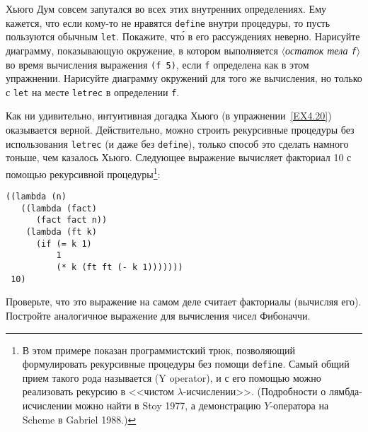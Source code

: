 \begin{exercise}{4.20}
\begin{plainenum}
\item
Хьюго Дум совсем запутался во всех этих
внутренних определениях.  Ему кажется, что если кому-то не нравятся
{\tt define} внутри процедуры, то пусть пользуются обычным
{\tt let}.  Покажите, чт\'{о} в его рассуждениях неверно. Нарисуйте
диаграмму, показывающую окружение, в котором выполняется
\textit{$\langle$остаток тела {\tt f}$\rangle$} во время вычисления
выражения {\tt (f 5)}, если {\tt f} определена как в
этом упражнении.  Нарисуйте диаграмму окружений для того же
вычисления, но только с {\tt let} на месте {\tt letrec}
в определении {\tt f}.
\end{plainenum}
\end{exercise}

\begin{exercise}{4.21}%
\label{EX4.21}%
Как ни удивительно, интуитивная догадка Хьюго (в
упражнении~\ref{EX4.20}) оказывается верной.
Действительно, можно
строить рекурсивные процедуры без использования {\tt letrec} (и
даже без {\tt define}), только способ это сделать намного
тоньше, чем казалось Хьюго.
Следующее выражение вычисляет факториал 10 с
помощью рекурсивной процедуры\footnote{В этом примере показан 
программистский трюк,
позволяющий формулировать рекурсивные процедуры без помощи
{\tt define}.  Самый общий прием такого рода называется 
 (Y operator), и с его помощью 
можно реализовать
рекурсию в <<чистом $\lambda$-исчислении>>. (Подробности о лямбда-исчислении
можно найти в Stoy 1977,
а демонстрацию $Y$-оператора
на Scheme в Gabriel 1988.)}:

\begin{Verbatim}[fontsize=\small]
((lambda (n)
   ((lambda (fact)
      (fact fact n))
    (lambda (ft k)
      (if (= k 1)
          1
          (* k (ft ft (- k 1)))))))
 10)
\end{Verbatim}

\begin{plainenum}


\item
Проверьте, что это выражение на самом деле считает факториалы
(вычисляя его).  Постройте аналогичное выражение для
вычисления чисел Фибоначчи.


\end{plainenum}
\end{exercise}

